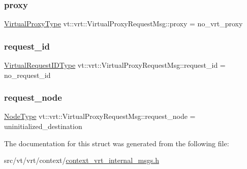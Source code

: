 \subsubsection{\texorpdfstring{proxy}{proxy}}
{\footnotesize\ttfamily \hyperlink{namespacevt_a1b417dd5d684f045bb58a0ede70045ac}{Virtual\+Proxy\+Type} vt\+::vrt\+::\+Virtual\+Proxy\+Request\+Msg\+::proxy = no\+\_\+vrt\+\_\+proxy}

\mbox{\label{structvt_1_1vrt_1_1_virtual_proxy_request_msg_a1cbd1a90c8e622e455d2d9dffd7631cf}} 
\subsubsection{\texorpdfstring{request\+\_\+id}{request\_id}}
{\footnotesize\ttfamily \hyperlink{namespacevt_1_1vrt_ac7ef8820ebfc383fa16f09bf46eaa2b8}{Virtual\+Request\+I\+D\+Type} vt\+::vrt\+::\+Virtual\+Proxy\+Request\+Msg\+::request\+\_\+id = no\+\_\+request\+\_\+id}

\mbox{\label{structvt_1_1vrt_1_1_virtual_proxy_request_msg_a17ef52708baa6ba8c47e5a8b7e3a0eb9}} 
\subsubsection{\texorpdfstring{request\+\_\+node}{request\_node}}
{\footnotesize\ttfamily \hyperlink{namespacevt_a866da9d0efc19c0a1ce79e9e492f47e2}{Node\+Type} vt\+::vrt\+::\+Virtual\+Proxy\+Request\+Msg\+::request\+\_\+node = uninitialized\+\_\+destination}



The documentation for this struct was generated from the following file\+:\begin{DoxyCompactItemize}
\item 
src/vt/vrt/context/\hyperlink{context__vrt__internal__msgs_8h}{context\+\_\+vrt\+\_\+internal\+\_\+msgs.\+h}\end{DoxyCompactItemize}
